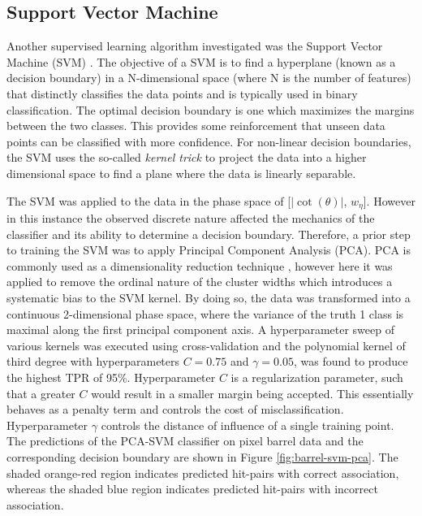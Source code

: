 \subsection{Support Vector Machine}


Another supervised learning algorithm investigated was the Support Vector Machine (SVM) \cite{svm}. The objective of a SVM is to find a hyperplane (known as a decision boundary) in a N-dimensional space (where N is the number of features) that distinctly classifies the data points and is typically used in binary classification. The optimal decision boundary is one which maximizes the margins between the two classes. This provides some reinforcement that unseen data points can be classified with more confidence. For non-linear decision boundaries, the SVM uses the so-called \textit{kernel trick} to project the data into a higher dimensional space to find a plane where the data is linearly separable. 

The SVM was applied to the data in the phase space of  [$|\cot(\theta)|$, $w_{\eta}$]. However in this instance the observed discrete nature affected the mechanics of the classifier and its ability to determine a decision boundary. Therefore, a prior step to training the SVM was to apply Principal Component Analysis (PCA). PCA is commonly used as a dimensionality reduction technique \cite{pca}, however here it was applied to remove the ordinal nature of the cluster widths which introduces a systematic bias to the SVM kernel. By doing so, the data was transformed into a continuous 2-dimensional phase space, where the variance of the truth 1 class is maximal along the first principal component axis. A hyperparameter sweep of various kernels was executed using cross-validation and the polynomial kernel of third degree with hyperparameters $C=0.75$ and $\gamma=0.05$, was found to produce the highest TPR of 95\%. Hyperparameter $C$ is a regularization parameter, such that a greater $C$ would result in a smaller margin being accepted. This essentially behaves as a penalty term and controls the cost of misclassification. Hyperparameter $\gamma$ controls the distance of influence of a single training point. The predictions of the PCA-SVM classifier on pixel barrel data and the corresponding decision boundary are shown in Figure \ref{fig:barrel-svm-pca}. The shaded orange-red region indicates predicted hit-pairs with correct association, whereas the shaded blue region indicates predicted hit-pairs with incorrect association.

